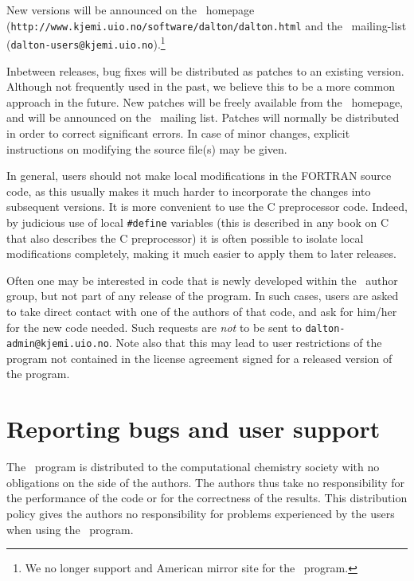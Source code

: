 New versions will be announced on the \dalton\
homepage\\
(\verb|http://www.kjemi.uio.no/software/dalton/dalton.html| 
and the \dalton\ mailing-list
(\verb|dalton-users@kjemi.uio.no|).\footnote{We no
  longer support and American mirror site for the \dalton\ program.}

Inbetween releases, bug fixes will be distributed as
patches to an
existing version. Although not frequently used in the past, we believe
this to be a more common approach in the future. New patches will be
freely available from the 
\dalton\ homepage, and will be announced on the \dalton\ mailing
list. Patches will normally be distributed in order to correct
significant errors. In case of minor changes, explicit
instructions on modifying the source file(s) may be given.

In general, users should not make local
modifications in the FORTRAN source code, as this usually makes it
much harder to incorporate the changes into subsequent versions.
It is more convenient to use the C preprocessor code.  Indeed, by
judicious use of local \verb|#define|\index{define} variables (this
is described in any book on C that also describes the C
preprocessor) it is often possible to isolate local
modifications completely, making it much easier
to apply them to later
releases.

Often one may be interested in code that is newly developed\index{new
code} within the
\dalton\ author group, but not part of any release of the program. In
such cases, users are asked to take direct contact with one of the
authors of that code, and ask for him/her for the new code
needed. Such requests are {\em not} to be sent to
\verb|dalton-admin@kjemi.uio.no|. Note also that this may lead to user
restrictions of the program not contained in the license agreement
signed for a released version of the program.

\section{Reporting bugs and user support}

The \dalton\ program is distributed to the computational chemistry
society with no obligations on the side of the
authors. The authors thus take no responsibility
for the performance
of the code or for the correctness of the
results. This distribution
policy gives the authors no responsibility for problems experienced by
the users when using the \dalton\ program.

